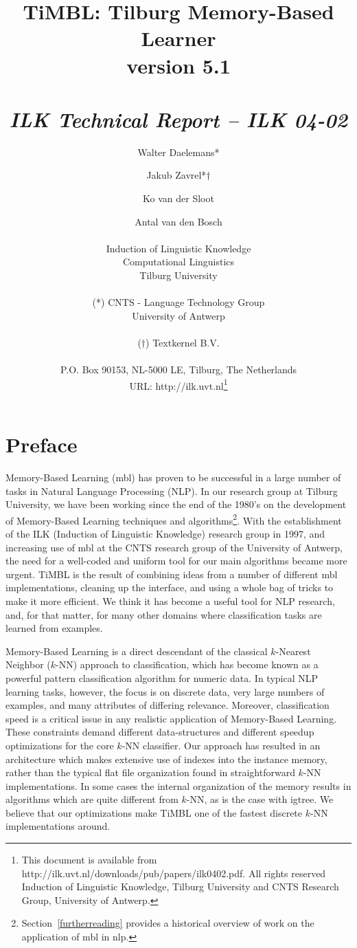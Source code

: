 \documentclass{report}
\author{Walter Daelemans* \and Jakub Zavrel*$\dagger$ \and Ko van der Sloot \and
	Antal van den Bosch\\ \ \\
	Induction of Linguistic Knowledge\\
	Computational Linguistics\\ 
        Tilburg University \\ \\
	(*) CNTS - Language Technology Group\\
	University of Antwerp\\ \\
	($\dagger$) Textkernel B.V.\\ \\
        P.O. Box 90153, NL-5000 LE, Tilburg, The Netherlands \\ 
        URL: http://ilk.uvt.nl\thanks{This document is available from
	http://ilk.uvt.nl/downloads/pub/papers/ilk0402.pdf. All rights reserved
	Induction of Linguistic Knowledge, Tilburg University and 
        CNTS Research Group, University of Antwerp.}}
\title{{\huge TiMBL: Tilburg Memory-Based Learner} \\ \vspace*{0.5cm}
{\bf version 5.1} \\ \vspace*{0.5cm}{\huge Reference Guide}\\
\vspace*{1cm} {\it ILK Technical Report -- ILK 04-02}}
\begin{document}

\maketitle

\tableofcontents

\chapter*{Preface}

Memory-Based Learning ({\sc mbl}) has proven to be successful in a
large number of tasks in Natural Language Processing (NLP). In our
research group at Tilburg University, we have been working since the
end of the 1980's on the development of Memory-Based Learning
techniques and algorithms\footnote{Section~\ref{furtherreading}
provides a historical overview of work on the application of {\sc
mbl} in {\sc nlp}.}. With the establishment of the ILK (Induction of
Linguistic Knowledge) research group in 1997, and increasing use of
{\sc mbl} at the CNTS research group of the University of Antwerp, the
need for a well-coded and uniform tool for our main algorithms became
more urgent. TiMBL is the result of combining ideas from a number of
different {\sc mbl} implementations, cleaning up the interface, and
using a whole bag of tricks to make it more efficient. We think it has
become a useful tool for NLP research, and, for that matter, for many
other domains where classification tasks are learned from examples.

Memory-Based Learning is a direct descendant of the classical
$k$-Nearest Neighbor ($k$-NN) approach to classification, which has
become known as a powerful pattern classification algorithm for
numeric data. In typical NLP learning tasks, however, the focus is on
discrete data, very large numbers of examples, and many attributes of
differing relevance. Moreover, classification speed is a critical
issue in any realistic application of Memory-Based Learning. These
constraints demand different data-structures and different speedup
optimizations for the core $k$-NN classifier. Our approach has
resulted in an architecture which makes extensive use of indexes into
the instance memory, rather than the typical flat file organization
found in straightforward $k$-NN implementations. In some cases the
internal organization of the memory results in algorithms which are
quite different from $k$-NN, as is the case with {\sc igtree}. We
believe that our optimizations make TiMBL one of the fastest discrete
$k$-NN implementations around.
\end{document}

